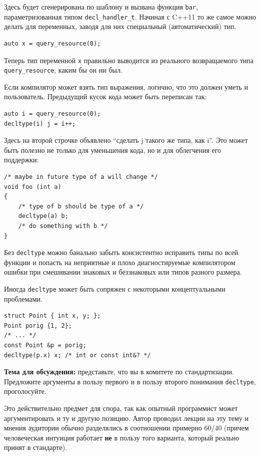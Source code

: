 \documentclass[a4paper,12pt,oneside]{book}
\begin{document}
Здесь будет сгенерирована по шаблону и вызвана функция \lstinline!bar!, параметризованная типом \lstinline!decl_handler_t!. Начиная с C++11 то же самое можно делать для переменных, заводя для них специальный (автоматический) тип.

\begin{lstlisting}
auto x = query_resource(0);
\end{lstlisting}

Теперь тип переменной \lstinline!x! правильно выводится из реального возвращаемого типа \lstinline!query_resource!, каким бы он ни был.

Если компилятор может взять тип выражения, логично, что это должен уметь и пользователь. Предыдущий кусок кода может быть переписан так:

\begin{lstlisting}
auto i = query_resource(0);
decltype(i) j = i++;
\end{lstlisting}

Здесь на второй строчке объявлено ``сделать j такого же типа, как i''. Это может быть полезно не только для уменьшения кода, но и для облегчения его поддержки:

\begin{lstlisting}
/* maybe in future type of a will change */
void foo (int a)
{
    /* type of b should be type of a */
    decltype(a) b;
    /* do something with b */
}
\end{lstlisting}

Без \lstinline!decltype! можно банально забыть консистентно исправить типы по всей функции и попасть на неприятные и плохо диагностируемые компилятором ошибки при смешивании знаковых и беззнаковых или типов разного размера.

Иногда \lstinline!decltype! может быть сопряжен с некоторыми концептуальными проблемами.

\begin{lstlisting}
struct Point { int x, y; };
Point porig {1, 2};
/* ... */
const Point &p = porig;
decltype(p.x) x; /* int or const int&? */
\end{lstlisting}

\textbf{Тема для обсуждения:} представьте, что вы в комитете по стандартизации. Предложите аргументы в пользу первого и в пользу второго понимания \lstinline!decltype!, проголосуйте.

Это действительно предмет для спора, так как опытный программист может аргументировать и ту и другую позицию. Автор проводил лекции на эту тему и мнения аудитории обычно разделялись в соотношении примерно 60/40 (причем человеческая интуиция работает \textbf{не} в пользу того варианта, который реально принят в стандарте).
\end{document}
